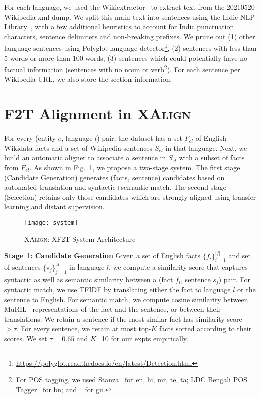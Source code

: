 \documentclass[11pt]{article}
\begin{document}
For each language, we used the Wikiextractor~\cite{Wikiextractor2015} to extract text from the 20210520 Wikipedia xml dump. We split this main text into sentences using the Indic NLP Library~\cite{kunchukuttan2020indicnlp}, with a few additional heuristics to account for Indic punctuation characters, sentence delimiters and non-breaking prefixes. We prune out (1) other language sentences using Polyglot language detector\footnote{\url{https://polyglot.readthedocs.io/en/latest/Detection.html}}, (2)  sentences with less than 5 words or more than 100 words, (3) sentences which could potentially have no factual information (sentences with no noun or verb\footnote{For POS tagging, we used Stanza~\cite{qi2020stanza} for en, hi, mr, te, ta; LDC Bengali POS Tagger~\cite{bali2010indian} for bn; and ~\cite{patel2008part} for gu.}). For each sentence per Wikipedia URL, we also store the section information.

\section{F2T Alignment in \textsc{XAlign}}
\label{sec:alignment}
For every (entity $e$, language $l$) pair, the dataset has a set $F_{el}$ of English Wikidata facts and a set of Wikipedia sentences $S_{el}$ in that language. Next, we build an automatic aligner to associate a sentence in $S_{el}$ with a subset of facts from $F_{el}$. As shown in Fig.~\ref{fig:system}, we propose a two-stage system. The first stage (Candidate Generation) generates (facts, sentence) candidates based on automated translation and syntactic+semantic match. The second stage (Selection) retains only those candidates which are strongly aligned using transfer learning and distant supervision.

\begin{figure}[!t]
    \centering
    \texttt{[image: system]}
    \caption{\textsc{XAlign}: XF2T System Architecture}
    \label{fig:system}
\end{figure}



\noindent\textbf{Stage 1: Candidate Generation}
Given a set of English facts $\{f_i\}_{i=1}^{|f|}$ and set of sentences $\{s_j\}_{j=1}^{|s|}$ in language $l$, we compute a similarity score that captures syntactic as well as semantic similarity between a (fact $f_i$, sentence $s_j$) pair.
For syntactic match, we use TFIDF by translating either the fact to language $l$ or the sentence to English. For semantic match, we compute cosine similarity between MuRIL~\cite{khanuja2021muril} representations of the fact and the sentence, or between their translations. We retain a sentence if the most similar fact has similarity score $>\tau$. For every sentence, we retain at most top-$K$ facts sorted according to their scores. We set $\tau=0.65$ and $K$=10 for our expts empirically.
\end{document}
